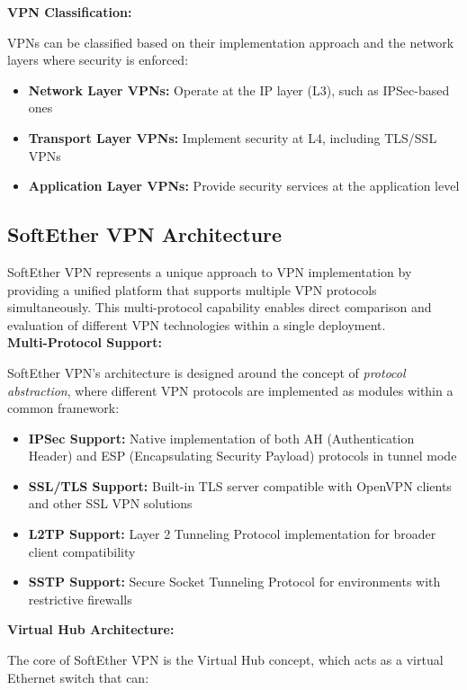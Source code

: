 \noindent
\textbf{VPN Classification:}

\noindent
VPNs can be classified based on their implementation approach and the network layers where security is enforced:

\begin{itemize}
    \item \textbf{Network Layer VPNs:} Operate at the IP layer (L3), such as IPSec-based ones
    \item \textbf{Transport Layer VPNs:} Implement security at L4, including TLS/SSL VPNs
    \item \textbf{Application Layer VPNs:} Provide security services at the application level
\end{itemize}

\subsection{SoftEther VPN Architecture}

SoftEther VPN represents a unique approach to VPN implementation by providing a unified platform that supports multiple VPN protocols simultaneously. This multi-protocol capability enables direct comparison and evaluation of different VPN technologies within a single deployment.\\

\noindent
\textbf{Multi-Protocol Support:}

\noindent
SoftEther VPN's architecture is designed around the concept of \textit{protocol abstraction}, where different VPN protocols are implemented as modules within a common framework:

\begin{itemize}
    \item \textbf{IPSec Support:} Native implementation of both AH (Authentication Header) and ESP (Encapsulating Security Payload) protocols in tunnel mode
    \item \textbf{SSL/TLS Support:} Built-in TLS server compatible with OpenVPN clients and other SSL VPN solutions
    \item \textbf{L2TP Support:} Layer 2 Tunneling Protocol implementation for broader client compatibility
    \item \textbf{SSTP Support:} Secure Socket Tunneling Protocol for environments with restrictive firewalls
\end{itemize}

\noindent
\textbf{Virtual Hub Architecture:}

\noindent
The core of SoftEther VPN is the Virtual Hub concept, which acts as a virtual Ethernet switch that can:

